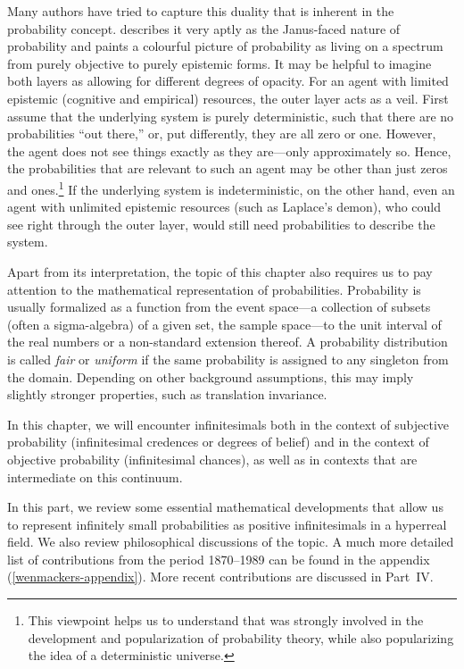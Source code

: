 Many authors have tried to capture this duality that is inherent in the probability concept. \citet{Hacking:1975} describes it very aptly as the Janus-faced nature of probability and \citet{Gaifman:1986} paints a colourful picture of probability as living on a spectrum from purely objective to purely epistemic forms.
It may be helpful to imagine both layers as allowing for different degrees of opacity.
For an agent with limited epistemic (cognitive and empirical) resources, the outer layer acts as a veil.
First assume that the underlying system is purely deterministic, such that there are no probabilities ``out there,'' or, put differently, they are all zero or one. However, the agent does not see things exactly as they are---only approximately so. Hence, the probabilities that are relevant to such an agent may be other than just zeros and ones.\footnote{This viewpoint helps us to understand that \citet{Laplace:1814} was strongly involved in the development and popularization of probability theory, while also popularizing the idea of a deterministic universe.} If the underlying system is indeterministic, on the other hand, even an agent with unlimited epistemic resources (such as Laplace's demon), who could see right through the outer layer, would still need probabilities to describe the system.

%

Apart from its interpretation, the topic of this chapter also requires us to pay attention to the mathematical representation of probabilities. Probability is usually formalized as a function from the event space---a collection of subsets (often a sigma-algebra) of a given set, the sample space---to the unit interval of the real numbers or a non-standard extension thereof. A probability distribution is called \textit{fair} or \textit{uniform} if the same probability is assigned to any singleton from the domain. Depending on other background assumptions, this may imply slightly stronger properties, such as translation invariance.

In this chapter, we will encounter infinitesimals both in the context of subjective probability (infinitesimal credences or degrees of belief) and in the context of objective probability (infinitesimal chances), as well as in contexts that are intermediate on this continuum.

\label{part:hist}

\noindent In this part, we review some essential mathematical developments that allow us to represent infinitely small probabilities as positive infinitesimals in a hyperreal field. We also review philosophical discussions of the topic. A much more detailed list of contributions from the period 1870--1989 can be found in the appendix (\autoref{wenmackers-appendix}). More recent contributions are discussed in Part~IV.

